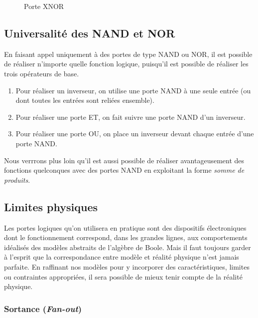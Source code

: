\documentclass[11pt]{article}
\begin{document}
\begin{figure}[htbp]
\centering

\caption{\label{fig:orgc405fed}Porte XNOR}
\end{figure}

\subsection{Universalité des NAND et NOR}
\label{sec:org6b1ebbd}

En faisant appel uniquement à des portes de type NAND ou NOR, il est
possible de réaliser n'importe quelle fonction logique, puisqu'il est
possible de réaliser les trois opérateurs de base.

\begin{enumerate}
\item Pour réaliser un inverseur, on utilise une porte NAND à une seule
entrée (ou dont toutes les entrées sont reliées ensemble).
\item Pour réaliser une porte ET, on fait suivre une porte NAND d'un
inverseur.
\item Pour réaliser une porte OU, on place un inverseur devant chaque
entrée d'une porte NAND.
\end{enumerate}

Nous verrrons plus loin qu'il est aussi possible de réaliser
avantageusement des fonctions quelconques avec des portes NAND en
exploitant la forme \emph{somme de produits}.

\subsection{Limites physiques}
\label{sec:org39b9e1d}

Les portes logiques qu'on utilisera en pratique sont des dispositifs
électroniques dont le fonctionnement correspond, dans les grandes
lignes, aux comportements idéalisés des modèles abstraits de l'algèbre
de Boole. Mais il faut toujours garder à l'esprit que la
correspondance entre modèle et réalité physique n'est jamais
parfaite. En raffinant nos modèles pour y incorporer des
caractéristiques, limites ou contraintes appropriées, il sera possible
de mieux tenir compte de la réalité physique.

\subsubsection{Sortance (\emph{Fan-out})}
\label{sec:org3d68dd1}
\end{document}
